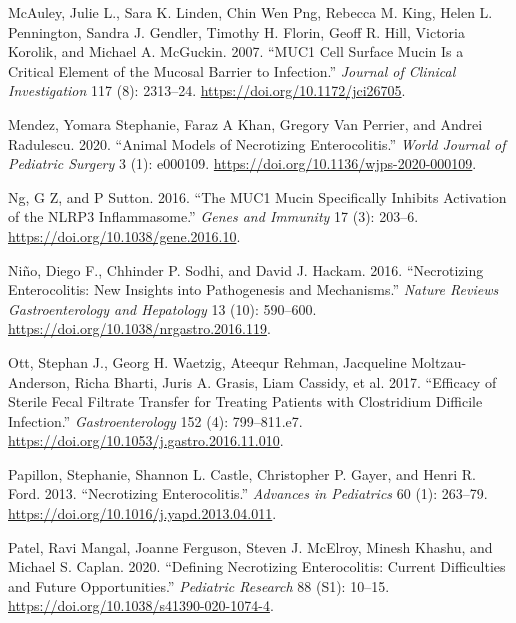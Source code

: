 \documentclass[
]{article}
\newlength{\cslhangindent}
\newlength{\cslentryspacingunit} %
\newenvironment{CSLReferences}[2] %
 {%
  \setlength{\parindent}{0pt}
  \ifodd #1
  \let\oldpar\par
  \def\par{\hangindent=\cslhangindent\oldpar}
  \fi
  \setlength{\parskip}{#2\cslentryspacingunit}
 }%
 {}
\begin{document}
\begin{CSLReferences}{1}{0}
\leavevmode{}%
McAuley, Julie L., Sara K. Linden, Chin Wen Png, Rebecca M. King, Helen L. Pennington, Sandra J. Gendler, Timothy H. Florin, Geoff R. Hill, Victoria Korolik, and Michael A. McGuckin. 2007. {``{MUC}1 Cell Surface Mucin Is a Critical Element of the Mucosal Barrier to Infection.''} \emph{Journal of Clinical Investigation} 117 (8): 2313--24. \url{https://doi.org/10.1172/jci26705}.

\leavevmode{}%
Mendez, Yomara Stephanie, Faraz A Khan, Gregory Van Perrier, and Andrei Radulescu. 2020. {``Animal Models of Necrotizing Enterocolitis.''} \emph{World Journal of Pediatric Surgery} 3 (1): e000109. \url{https://doi.org/10.1136/wjps-2020-000109}.

\leavevmode{}%
Ng, G Z, and P Sutton. 2016. {``The {MUC}1 Mucin Specifically Inhibits Activation of the {NLRP}3 Inflammasome.''} \emph{Genes and Immunity} 17 (3): 203--6. \url{https://doi.org/10.1038/gene.2016.10}.

\leavevmode{}%
Niño, Diego F., Chhinder P. Sodhi, and David J. Hackam. 2016. {``Necrotizing Enterocolitis: New Insights into Pathogenesis and Mechanisms.''} \emph{Nature Reviews Gastroenterology and Hepatology} 13 (10): 590--600. \url{https://doi.org/10.1038/nrgastro.2016.119}.

\leavevmode{}%
Ott, Stephan J., Georg H. Waetzig, Ateequr Rehman, Jacqueline Moltzau-Anderson, Richa Bharti, Juris A. Grasis, Liam Cassidy, et al. 2017. {``Efficacy of Sterile Fecal Filtrate Transfer for Treating Patients with Clostridium Difficile Infection.''} \emph{Gastroenterology} 152 (4): 799--811.e7. \url{https://doi.org/10.1053/j.gastro.2016.11.010}.

\leavevmode{}%
Papillon, Stephanie, Shannon L. Castle, Christopher P. Gayer, and Henri R. Ford. 2013. {``Necrotizing Enterocolitis.''} \emph{Advances in Pediatrics} 60 (1): 263--79. \url{https://doi.org/10.1016/j.yapd.2013.04.011}.

\leavevmode{}%
Patel, Ravi Mangal, Joanne Ferguson, Steven J. McElroy, Minesh Khashu, and Michael S. Caplan. 2020. {``Defining Necrotizing Enterocolitis: Current Difficulties and Future Opportunities.''} \emph{Pediatric Research} 88 (S1): 10--15. \url{https://doi.org/10.1038/s41390-020-1074-4}.


\end{CSLReferences}
\end{document}
